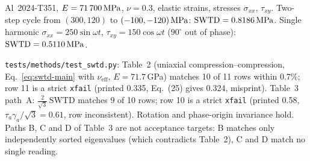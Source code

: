  Al~2024-T351, $E=71\,700\,\mathrm{MPa}$, $\nu=0.3$, elastic strains, stresses
$\sigma_{xx}$, $\tau_{xy}$. Two-step cycle from $(300,120)$ to $(-100,-120)\,\mathrm{MPa}$:
$\mathrm{SWTD}=0.8186\,\mathrm{MPa}$. Single harmonic $\sigma_{xx}=250\sin\omega t$,
$\tau_{xy}=150\cos\omega t$ ($90^\circ$ out of phase): $\mathrm{SWTD}=0.5110\,\mathrm{MPa}$.

 \texttt{tests/methods/test\_swtd.py}: Table~2 (uniaxial
compression--compression, Eq.~\eqref{eq:swtd-main} with $\nu_\text{eff}$, $E=71.7$\,GPa) matches 10
of 11 rows within 0.7\%; row 11 is a strict \texttt{xfail} (printed 0.335, Eq.~(25) gives 0.324,
misprint). Table~3 path~A: $\tfrac{2}{\sqrt3}\,\mathrm{SWTD}$ matches 9 of 10 rows; row 10 is a
strict \texttt{xfail} (printed 0.58, $\tau_a\gamma_a/\sqrt3=0.61$, row inconsistent). Rotation and
phase-origin invariance hold. Paths B, C and D of Table~3 are not acceptance targets: B matches only
independently sorted eigenvalues (which contradicts Table~2), C and D match no single reading.
